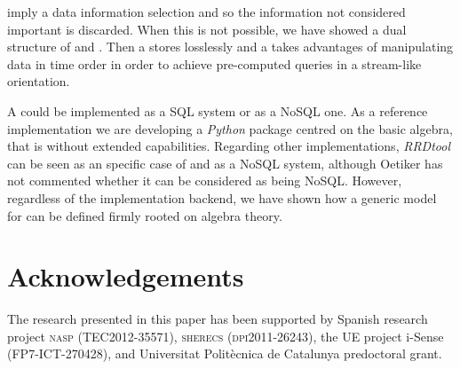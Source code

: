  imply a data information selection and so the information
not considered important is discarded. When this is not possible, we
have showed a dual structure of  and . Then a
 stores losslessly and a  takes advantages of
manipulating data in time order in order to achieve pre-computed
queries in a stream-like orientation.





A  could be implemented as a SQL  system or as
a NoSQL one. As a reference implementation we are developing a
\emph{Python} package centred on the basic algebra, that is without
extended  capabilities. Regarding other implementations,
\emph{RRDtool} can be seen as an specific case of  and as
a NoSQL system, although Oetiker \cite{rrdtool} has not commented
whether it can be considered as being NoSQL. However, regardless of
the implementation backend, we have shown how a generic model for
 can be defined firmly rooted on  algebra
theory.









\section{Acknowledgements}


The research presented in this paper has been supported by Spanish
research project \textsc{nasp (TEC2012-35571)}, \textsc{sherecs
  (dpi2011-26243)}, the UE project i-Sense ({\small FP7-ICT-270428}),
and Universitat Polit\`{e}cnica de Catalunya predoctoral grant.








